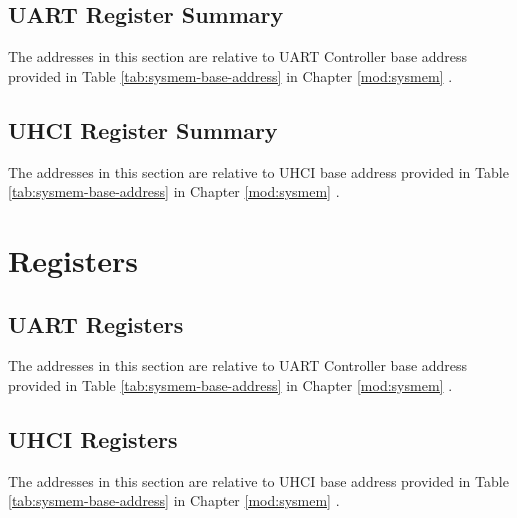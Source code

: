 \documentclass[main\_\_EN.tex]{subfiles}
\begin{document}
\subsection{UART Register Summary}

The addresses in this section are relative to UART Controller base address provided in Table \ref{tab:sysmem-base-address} in Chapter \ref{mod:sysmem} \textit{}.



\subsection{UHCI Register Summary}

The addresses in this section are relative to UHCI base address provided in Table \ref{tab:sysmem-base-address} in Chapter \ref{mod:sysmem} \textit{}.






\clearpage
\section{Registers}

\subsection{UART Registers}

The addresses in this section are relative to UART Controller base address provided in Table \ref{tab:sysmem-base-address} in Chapter \ref{mod:sysmem} \textit{}.



\clearpage
\subsection{UHCI Registers}

The addresses in this section are relative to UHCI base address provided in Table \ref{tab:sysmem-base-address} in Chapter \ref{mod:sysmem} \textit{}.


\end{document}
